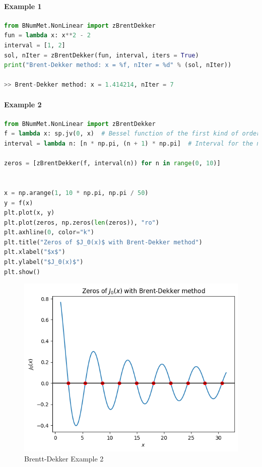\paragraph{Example 1}{
\begin{lstlisting}[language=Python]
from BNumMet.NonLinear import zBrentDekker
fun = lambda x: x**2 - 2
interval = [1, 2]
sol, nIter = zBrentDekker(fun, interval, iters = True)
print("Brent-Dekker method: x = %f, nIter = %d" % (sol, nIter))

>> Brent-Dekker method: x = 1.414214, nIter = 7
\end{lstlisting}
}
\paragraph{Example 2}{
\begin{lstlisting}[language=Python]
from BNumMet.NonLinear import zBrentDekker
f = lambda x: sp.jv(0, x)  # Bessel function of the first kind of order 0
interval = lambda n: [n * np.pi, (n + 1) * np.pi]  # Interval for the n-th zero

zeros = [zBrentDekker(f, interval(n)) for n in range(0, 10)]


x = np.arange(1, 10 * np.pi, np.pi / 50)
y = f(x)
plt.plot(x, y)
plt.plot(zeros, np.zeros(len(zeros)), "ro")
plt.axhline(0, color="k")
plt.title("Zeros of $J_0(x)$ with Brent-Dekker method")
plt.xlabel("$x$")
plt.ylabel("$J_0(x)$")
plt.show()
\end{lstlisting}
\begin{figure}[H]
    \centering
    \includegraphics{Include/Images/Thesis/Documentation/NonLinear/Brentt-Dekker Example 2.png}
    \caption{Brentt-Dekker Example 2}
    \label{fig:Brentt-Dekker Example 2}
\end{figure}
}